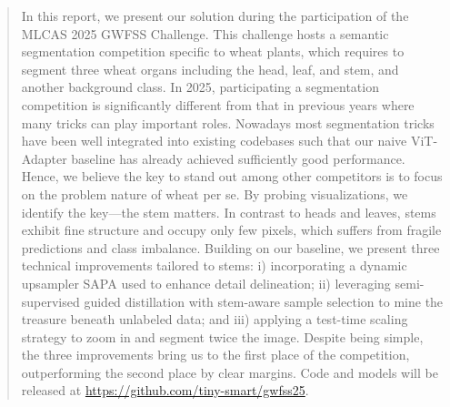\begin{abstract}
In this report, we present our solution during the participation of the MLCAS 2025 GWFSS Challenge. This challenge hosts a semantic segmentation competition specific to wheat plants, which requires to segment three wheat organs including the head, leaf, and stem, and another background class. In 2025, participating a segmentation competition is significantly different from that in previous years where many tricks can play important roles. Nowadays most segmentation tricks have been well integrated into existing codebases such that our naive ViT-Adapter baseline has already achieved sufficiently good performance. Hence, we believe the key to stand out among other competitors is to focus on the problem nature of wheat per se. By probing visualizations, we identify the key---the stem matters. In contrast to heads and leaves, stems exhibit fine structure and occupy only few pixels, which suffers from fragile predictions and class imbalance. Building on our baseline, we present three technical improvements tailored to stems: i) incorporating a dynamic upsampler SAPA used to enhance detail delineation; ii) leveraging semi-supervised guided distillation with stem-aware sample selection to mine the treasure beneath unlabeled data; and iii) applying a test-time scaling strategy to zoom in and segment twice the image. Despite being simple, the three improvements bring us to the first place of the competition, outperforming the second place by clear margins. Code and models will be released at \url{https://github.com/tiny-smart/gwfss25}.

\end{abstract}